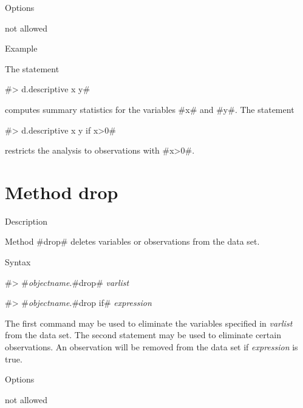\begin{stanza}{Options}

{not allowed}
\end{stanza}


\begin{stanza}{Example}

{The statement

#> d.descriptive x y#

computes summary statistics for the variables #x# and #y#.
The statement

#> d.descriptive x y if x>0#

restricts the analysis to observations with #x>0#.}
\end{stanza}

\clearpage

\section{Method drop}
\label{drop}   


\begin{stanza}{Description}

{Method #drop# deletes variables or observations from the data set.}
\end{stanza}

\begin{stanza}{Syntax}

{#> #{\em objectname}.#drop# {\em varlist}

#> #{\em objectname}.#drop if# {\em expression}

The first command may be used to eliminate the variables specified
in {\em varlist} from the data set. The second statement may be
used to eliminate certain observations. An observation will be
removed from the data set if {\em expression} is true.}
\end{stanza}


\begin{stanza}{Options}

{not allowed}
\end{stanza}


